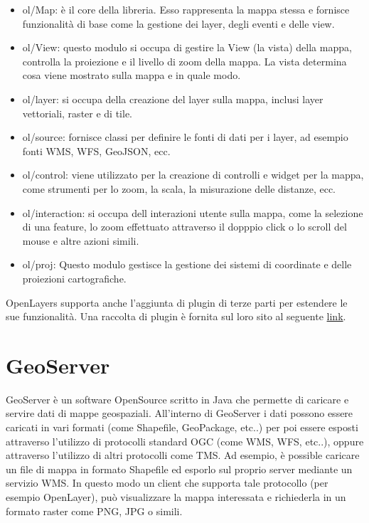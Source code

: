 \begin{itemize}
      \item ol/Map: è il core della libreria. Esso rappresenta la mappa stessa e fornisce funzionalità di base come la gestione dei layer, degli eventi e delle view.
      \item ol/View: questo modulo si occupa di gestire la View (la vista) della mappa, controlla la proiezione e il livello di zoom della mappa. La vista determina cosa viene mostrato sulla mappa e in quale modo.
      \item ol/layer: si occupa della creazione del layer sulla mappa, inclusi layer vettoriali, raster e di tile.
      \item ol/source: fornisce classi per definire le fonti di dati per i layer, ad esempio fonti WMS, WFS, GeoJSON, ecc.
      \item ol/control: viene utilizzato per la creazione di controlli e widget per la mappa, come strumenti per lo zoom, la scala, la misurazione delle distanze, ecc.
      \item ol/interaction: si occupa dell interazioni utente sulla mappa, come la selezione di una feature, lo zoom effettuato attraverso il dopppio click o lo scroll del mouse e altre azioni simili.
      \item ol/proj: Questo modulo gestisce la gestione dei sistemi di coordinate e delle proiezioni cartografiche.
\end{itemize}
OpenLayers supporta anche l'aggiunta di plugin di terze parti per estendere le sue funzionalità. Una raccolta di plugin è fornita sul loro sito al seguente \href{https://openlayers.org/3rd-party/}{link}.

\section{GeoServer}

GeoServer è un software OpenSource scritto in Java che permette di caricare e servire dati di mappe geospaziali.
All'interno di GeoServer i dati possono essere caricati in vari formati (come Shapefile, GeoPackage, etc..) per poi essere esposti attraverso l'utilizzo di protocolli standard OGC (come WMS, WFS, etc..), oppure attraverso l'utilizzo di altri protocolli come TMS.
Ad esempio, è possible caricare un file di mappa in formato Shapefile ed esporlo sul proprio server mediante un servizio WMS.
In questo modo un client che supporta tale protocollo (per esempio OpenLayer), può visualizzare la mappa interessata e richiederla in un formato raster come PNG, JPG o simili.


